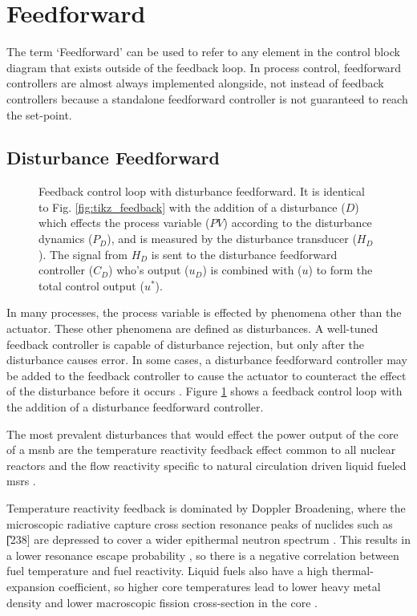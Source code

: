 \section{Feedforward}
The term `Feedforward' can be used to refer to any element in the control block diagram that exists outside of the feedback loop. In process control, feedforward controllers are almost always implemented alongside, not instead of feedback controllers because a standalone feedforward controller is not guaranteed to reach the set-point.  

\subsection{Disturbance Feedforward}
\begin{figure}[!ht]
    \centering
    
    \caption[Feedback control loop with disturbance feedforward]{Feedback control loop with disturbance feedforward. It is identical to Fig. \ref{fig:tikz_feedback} with the addition of a disturbance ($D$) which effects the process variable ($PV$) according to the disturbance dynamics ($P_D$), and is measured by the disturbance transducer ($H_D$). The signal from $H_D$ is sent to the disturbance feedforward controller ($C_D$) who's output ($u_D$) is combined with ($u$) to form the total control output ($u^*$).}
    \label{fig:tikz_feedforward}
\end{figure}

In many processes, the process variable is effected by phenomena other than the actuator. These other phenomena are defined as disturbances. A well-tuned feedback controller is capable of disturbance rejection, but only after the disturbance causes error. In some cases, a disturbance feedforward controller may be added to the feedback controller to cause the actuator to counteract the effect of the disturbance before it occurs \cite[Ch. 10]{Bequette}. Figure \ref{fig:tikz_feedforward} shows a feedback control loop with the addition of a disturbance feedforward controller.

The most prevalent disturbances that would effect the power output of the core of a \acs{msnb} are the temperature reactivity feedback effect common to all nuclear reactors and the flow reactivity specific to natural circulation driven  liquid fueled \acsp{msr} \cite{CarterNumerical}. 

Temperature reactivity feedback is dominated by Doppler Broadening, where the microscopic radiative capture cross section resonance peaks of nuclides such as \U[238] are depressed to cover a wider epithermal neutron spectrum \cite[Ch. 2]{DH}. This results in a lower resonance escape probability \cite[Ch. 3]{DH}, so there is a negative correlation between fuel temperature and fuel reactivity. Liquid fuels also have a high thermal-expansion coefficient, so higher core temperatures lead to lower heavy metal density and lower macroscopic fission cross-section in the core \cite{PetersonMS}.

